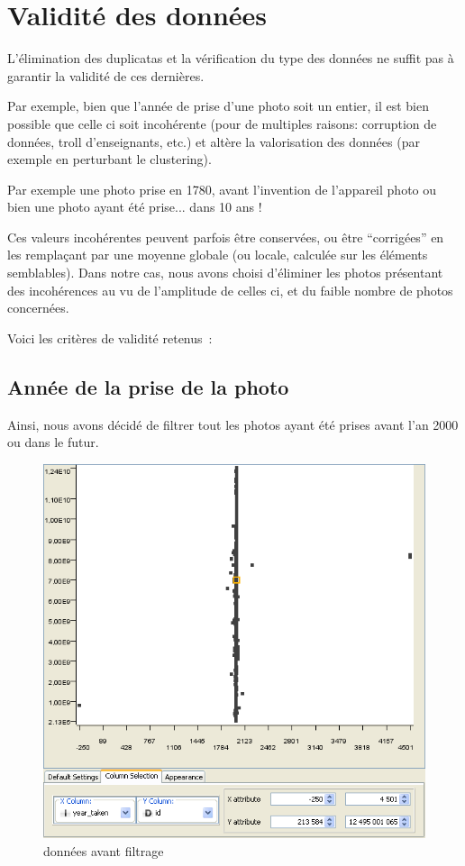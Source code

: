 \section{Validité des données}
    L'élimination des duplicatas et la vérification du type des données ne suffit pas à garantir la validité de ces dernières.

    Par exemple, bien que l'année de prise d'une photo soit un entier, il est bien possible que
    celle ci soit incohérente (pour de multiples raisons: corruption de données, troll d'enseignants, etc.) et
    altère la valorisation des données (par exemple en perturbant le clustering).

    Par exemple une photo prise en 1780, avant l'invention de l'appareil photo ou
    bien une photo ayant été prise... dans 10 ans !

    Ces valeurs incohérentes peuvent parfois être conservées, ou être ``corrigées'' en les remplaçant par une moyenne globale (ou locale,
    calculée sur les éléments semblables). Dans notre cas, nous avons choisi d'éliminer les photos présentant des incohérences au vu de
    l'amplitude de celles ci, et du faible nombre de photos concernées.

    Voici les critères de validité retenus~:

    \pagebreak
    \subsection{Année de la prise de la photo}
        Ainsi, nous avons décidé de filtrer tout les photos ayant été prises
        avant l'an 2000 ou dans le futur.

        \begin{figure}[h]
            \centering
            \includegraphics[scale=0.35]{../screenshots/year_id_before.png}
            \caption{données avant filtrage}
            \label{diagram:year_id_before}
        \end{figure}

